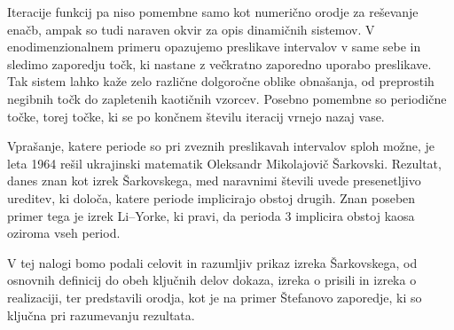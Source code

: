 \documentclass[../TG_magistrsko_delo_sections.tex]{subfiles}
\begin{document}
Iteracije funkcij pa niso pomembne samo kot numerično orodje za reševanje enačb, ampak so tudi naraven okvir za opis dinamičnih sistemov. V enodimenzionalnem primeru opazujemo preslikave intervalov v same sebe in sledimo zaporedju točk, ki nastane z večkratno zaporedno uporabo preslikave. Tak sistem lahko kaže zelo različne dolgoročne oblike obnašanja, od preprostih negibnih točk do zapletenih kaotičnih vzorcev. Posebno pomembne so periodične točke, torej točke, ki se po končnem številu iteracij vrnejo nazaj vase.

Vprašanje, katere periode so pri zveznih preslikavah intervalov sploh možne, je leta 1964 rešil ukrajinski matematik Oleksandr Mikolajovič Šarkovski. Rezultat, danes znan kot izrek Šarkovskega, med naravnimi števili uvede presenetljivo ureditev, ki določa, katere periode implicirajo obstoj drugih. Znan poseben primer tega je izrek Li–Yorke, ki pravi, da perioda 3 implicira obstoj kaosa oziroma vseh period.

V tej nalogi bomo podali celovit in razumljiv prikaz izreka Šarkovskega, od osnovnih definicij do obeh ključnih delov dokaza, izreka o prisili in izreka o realizaciji, ter predstavili orodja, kot je na primer Štefanovo zaporedje, ki so ključna pri razumevanju rezultata.
\end{document}
